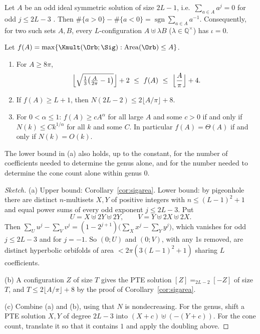 \begin{proposition}\label{prop:ptebalanced}
Let $A$ be an odd ideal symmetric solution of size $2L-1$, i.e.\ $\sum_{a\in A}a^j=0$ for odd
$j\le2L-3$ \cite[p.~8]{borweiningalls1994}. Then
$\#\{a>0\}-\#\{a<0\}=\operatorname{sgn}\sum_{a\in A}a^{-1}$. Consequently, for two such sets
$A,B$, every $L$-configuration $A\uplus\lambda B$ ($\lambda\in\mathbb Q^\times$) has
$\iota=0$.
\end{proposition}

\begin{theorem}[Growth]\label{thm:ptegrowth}
Let $f(A)=\max\{\Kmult(\Orb;\Sig):\operatorname{Area}(\Orb)\le A\}$.
\begin{enumerate}[label=(\alph*)]
\item For $A\ge8\pi$,
  \[
    \Bigl\lfloor\sqrt{\tfrac13\bigl(\tfrac{A}{2\pi}-1\bigr)}\Bigr\rfloor+2\ \le\ f(A)\ \le\ \Bigl\lfloor\frac{A}{\pi}\Bigr\rfloor+4 .
  \]
\item If $f(A)\ge L+1$, then $N(2L-2)\le2\lfloor A/\pi\rfloor+8$.
\item For $0<\alpha\le1$: $f(A)\ge cA^{\alpha}$ for all large $A$ and some $c>0$ if and only if
  $N(k)\le Ck^{1/\alpha}$ for all $k$ and some $C$. In particular $f(A)=\Theta(A)$ if and only
  if $N(k)=O(k)$.
\end{enumerate}
The lower bound in (a) also holds, up to the constant, for the number of coefficients needed
to determine the genus alone, and for the number needed to determine the cone count alone
within genus $0$.
\end{theorem}

\begin{proof}[Sketch]
(a) Upper bound: Corollary~\ref{cor:sigarea}. Lower bound: by pigeonhole there are distinct
$n$-multisets $X,Y$ of positive integers with $n\le(L-1)^2+1$ and equal power sums of every
odd exponent $j\le2L-3$. Put
\[
  U=X\uplus2Y\uplus2Y,\qquad V=Y\uplus2X\uplus2X .
\]
Then
$\sum_Uu^j-\sum_Vv^j=(1-2^{j+1})\bigl(\sum_Xx^j-\sum_Yy^j\bigr)$, which vanishes for odd
$j\le2L-3$ and for $j=-1$. So $(0;U)$ and $(0;V)$, with any 1s removed, are distinct hyperbolic
orbifolds of area $<2\pi(3(L-1)^2+1)$ sharing $L$ coefficients.

(b) A configuration $Z$ of size $T$ gives the PTE solution $[Z]=_{2L-2}[-Z]$ of size $T$, and
$T\le2\lfloor A/\pi\rfloor+8$ by the proof of Corollary~\ref{cor:sigarea}.

(c) Combine (a) and (b), using that $N$ is nondecreasing. For the genus, shift a PTE solution
$X,Y$ of degree $2L-3$ into $(X+c)\uplus(-(Y+c))$. For the cone count, translate it so that it
contains $1$ and apply the doubling above.
\end{proof}

